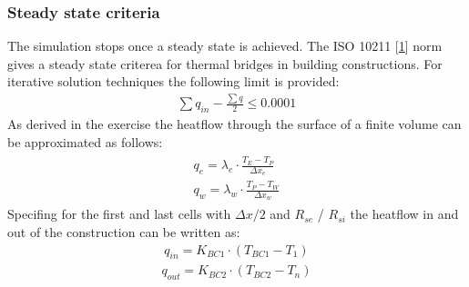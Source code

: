 \documentclass[letterpaper,10pt,english]{jupyterBook}
\begin{document}
\subsubsection{Steady state criteria}
\label{\detokenize{Aufgabe1:steady-state-criteria}}
\sphinxAtStartPar
The simulation stops once a steady state is achieved. The ISO 10211 {[}\hyperlink{cite.Aufgabe1:id8}{1}{]} norm gives a steady state criterea for thermal bridges in building constructions. For iterative solution techniques the following limit is provided:
\begin{equation}\label{equation:Aufgabe1:label}
\begin{split} \sum q_{in} - \frac{\sum q}{2} \le 0.0001 \end{split}
\end{equation}
\sphinxAtStartPar
As derived in the exercise the heatflow through the surface of a finite volume can be approximated as follows:
\begin{equation}\label{equation:Aufgabe1:flows}
\begin{split}\begin{align}
q_{e} = \lambda_e \cdot \frac{T_E-T_P}{\Delta x_e} \\
q_{w} = \lambda_w \cdot \frac{T_P-T_W}{\Delta x_w}
\end{align}\end{split}
\end{equation}
\sphinxAtStartPar
Specifing for the first and last cells with \(\Delta x /2\) and \(R_{se}\) / \(R_{si}\) the heatflow in and out of the construction can be written as:
\begin{equation}\label{equation:Aufgabe1:label}
\begin{split} q_{in} = K_{BC1} \cdot (T_{BC1}-T_{1}) \end{split}
\end{equation}\begin{equation}\label{equation:Aufgabe1:label}
\begin{split} q_{out} = K_{BC2} \cdot (T_{BC2}-T_{n}) \end{split}
\end{equation}
\end{document}
